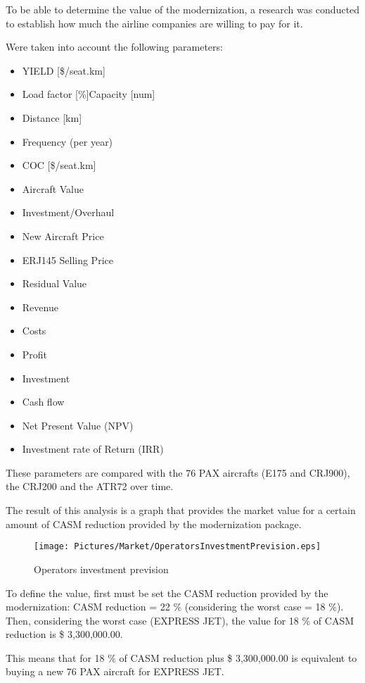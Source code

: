 To be able to determine the value of the modernization, a research was conducted to establish how much the airline companies are willing to pay for it.

Were taken into account the following parameters:

\begin{itemize}
  \item YIELD [\$/seat.km]
  \item Load factor [\%]Capacity [num]
  \item Distance [km]
  \item Frequency (per year)
  \item COC [\$/seat.km]
  \item Aircraft Value
  \item Investment/Overhaul
  \item New Aircraft Price
  \item ERJ145 Selling Price
  \item Residual Value	
  \item Revenue
  \item Costs
  \item Profit
  \item Investment
  \item Cash flow
  \item Net Present Value (NPV)
  \item Investment rate of Return (IRR)
\end{itemize}

These parameters are compared with the 76 PAX aircrafts (E175 and CRJ900), the CRJ200 and the ATR72 over time.

The result of this analysis is a graph that provides the market value for a certain amount of CASM reduction provided by the modernization package.

\begin{figure}[H]
  \centering
  \texttt{[image: Pictures/Market/OperatorsInvestmentPrevision.eps]}\\
  \caption{Operators investment prevision}
  \label{OperInvestPrevis}
\end{figure}

To define the value, first must be set the CASM reduction provided by the modernization:
CASM reduction = 22 \% (considering the worst case = 18 \%).
	Then, considering the worst case (EXPRESS JET), the value for 18 \% of CASM reduction is \$ 3,300,000.00. 

This means that for 18 \% of CASM reduction plus \$ 3,300,000.00 is equivalent to buying a new 76 PAX aircraft for EXPRESS JET.
